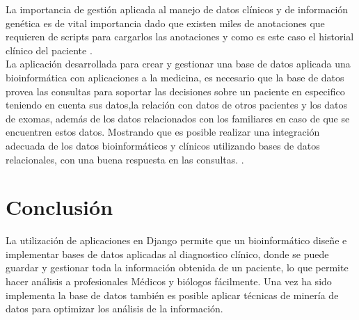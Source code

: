 La importancia de gestión aplicada al manejo de datos clínicos y de información genética es de vital importancia dado que existen miles de anotaciones que requieren de scripts para cargarlos las anotaciones y como es este caso el historial clínico del paciente \cite{Paila2013}. \\

La aplicación desarrollada para crear y gestionar una base de datos aplicada una bioinformática con aplicaciones a la medicina, es necesario que la base de datos provea las consultas para soportar las decisiones sobre un paciente en especifico teniendo en cuenta sus datos,la relación con datos de otros pacientes y los datos de exomas, además de los datos relacionados con los familiares en caso de que se encuentren estos datos. Mostrando que es posible realizar una integración adecuada de los datos bioinformáticos y clínicos utilizando bases de datos relacionales, con una buena respuesta en las consultas. \cite{Sujansky2001}.

\section{Conclusión}

La utilización de aplicaciones en Django permite que un bioinformático diseñe e implementar bases de datos aplicadas al diagnostico clínico, donde se puede guardar y gestionar toda la información obtenida de un paciente, lo que permite hacer análisis a profesionales Médicos y biólogos fácilmente. Una vez ha sido implementa la base de datos también es posible aplicar técnicas de minería de datos para optimizar los análisis de la información. \\